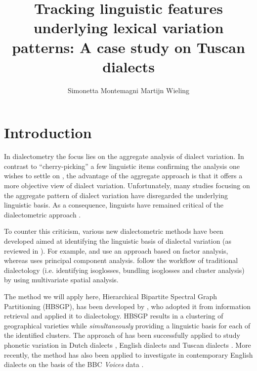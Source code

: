\documentclass[output=paper]{LSP/langsci}
\author{Simonetta Montemagni\affiliation{Istituto di Linguistica Computazionale “Antonio Zampolli”, ILC-CNR} \lastand Martijn Wieling\affiliation{University of Groningen, CLCG}}
\title{Tracking linguistic features underlying lexical variation patterns: {A} case study on {T}uscan dialects}
\begin{document}
 
 
% 

% 
% 
% 
% 

\section{Introduction}
In dialectometry \citep{seguy_relation_1971} the focus lies on the aggregate analysis of dialect variation. In contrast to “cherry-picking” a few linguistic items confirming the analysis one wishes to settle on \citep{nerbonne_data-driven_2009}, the advantage of the aggregate approach is that it offers a more objective view of dialect variation. Unfortunately, many studies focusing on the aggregate pattern of dialect variation have disregarded the underlying linguistic basis. As a consequence, linguists have remained critical of the dialectometric approach \citep{schneider_qualitative_1988,woolhiser_political_2005, loporcaro_profilo_2009}. 

To counter this criticism, various new dialectometric methods have been developed aimed at identifying the linguistic basis of dialectal variation (as reviewed in \citealt{wieling_advances_2015}). For example, \citet{nerbonne_identifying_2006} and \citet{proll_latente_inpress} use an approach based on factor analysis, whereas \citet{shackleton_english-american_2005} uses principal component analysis. \citet{grieve_statistical_2011} follow the workflow of traditional dialectology (i.e. identifying isoglosses, bundling isoglosses and cluster analysis) by using multivariate spatial analysis. 

The method we will apply here, Hierarchical Bipartite Spectral Graph Partitioning (HBSGP), has been developed by \citet{wieling_bipartite_2009,wieling_hierarchical_2010, wieling_bipartite_2011}, who adopted it from information retrieval \citep{dhillon_co-clustering_2001} and applied it to dialectology. HBSGP results in a clustering of geographical varieties while \emph{simultaneously }providing a linguistic basis for each of the identified clusters. The approach of \citet{wieling_bipartite_2011} has been successfully applied to study phonetic variation in Dutch dialects \citep{wieling_bipartite_2011}, English dialects \citep{wieling_analyzing_2013} and Tuscan dialects \citep{montemagni_patterns_2012,montemagni_synchronic_2013}. More recently, the method has also been applied to investigate  in contemporary English dialects on the basis of the BBC \textit{Voices} data \citep{wieling_lexical_2014}.
\end{document}
